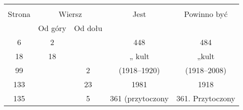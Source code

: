 \documentclass[a4paper,11pt]{article}
\begin{document}
\begin{center}

  \begin{tabular}{|c|c|c|c|c|}
    \hline
    & \multicolumn{2}{c|}{} & & \\
    Strona & \multicolumn{2}{c|}{Wiersz} & Jest
                              & Powinno być \\ \cline{2-3}
    & Od góry & Od dołu & & \\
    \hline
    6   &  2 & & 448 & 484 \\
    18  & 18 & & „ kult & „kult \\
    99  & &  2 & (1918--1920) & (1918--2008) \\
    133 & & 23 & 1981 & 1918 \\
    135 & &  5 & 361 (przytoczony & 361. Przytoczony \\
    \hline
  \end{tabular}

\end{center}

\vspace{\spaceTwo}







 {}



\end{document}
